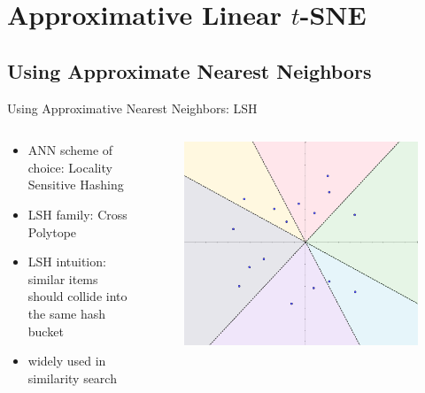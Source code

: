 \documentclass{beamer}
\begin{document}
\section{Approximative Linear $t$-SNE}

\subsection{Using Approximate Nearest Neighbors}

\begin{frame}[fragile]{Using Approximative Nearest Neighbors: LSH}
    \begin{columns}
    \begin{column}{0.6\textwidth}
        \begin{itemize}
            \item ANN scheme of choice: Locality Sensitive Hashing
            \item LSH family: Cross Polytope
            \item LSH intuition: similar items should collide into the same hash bucket
            \item widely used in similarity search
        \end{itemize}
    \end{column}
    \begin{column}{0.38\textwidth}
        \begin{figure}[h]
            \centering
            \includegraphics[width=\textwidth]{srp}
        \end{figure}
    \end{column}
\end{columns}
\end{frame}
\end{document}
